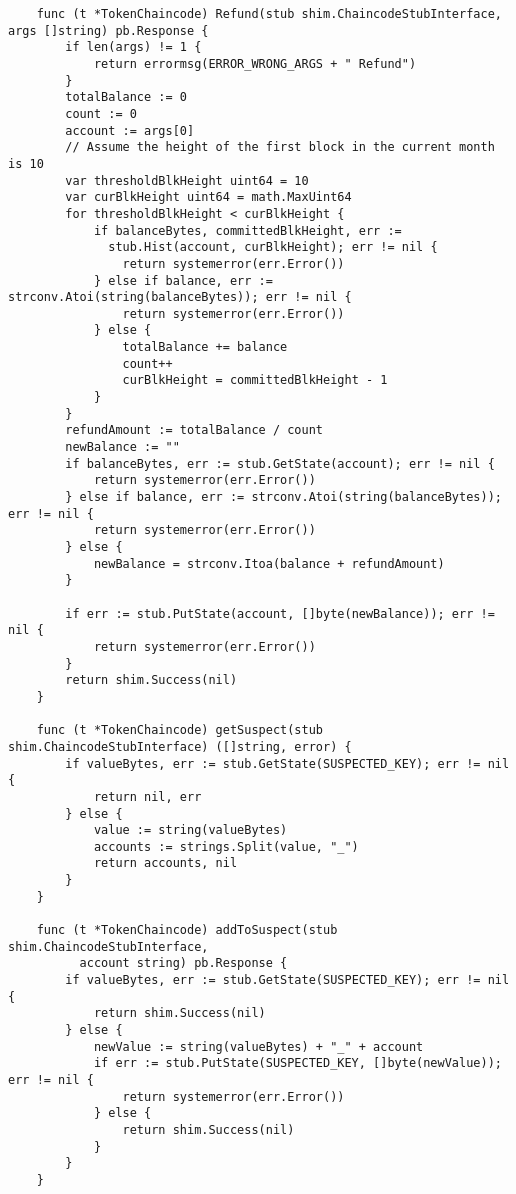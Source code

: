 \begin{lstlisting}
    func (t *TokenChaincode) Refund(stub shim.ChaincodeStubInterface, args []string) pb.Response {
        if len(args) != 1 { 
            return errormsg(ERROR_WRONG_ARGS + " Refund")
        }
        totalBalance := 0
        count := 0
        account := args[0]
        // Assume the height of the first block in the current month is 10
        var thresholdBlkHeight uint64 = 10
        var curBlkHeight uint64 = math.MaxUint64
        for thresholdBlkHeight < curBlkHeight {
            if balanceBytes, committedBlkHeight, err := 
              stub.Hist(account, curBlkHeight); err != nil {
                return systemerror(err.Error())
            } else if balance, err := strconv.Atoi(string(balanceBytes)); err != nil {
                return systemerror(err.Error())
            } else {
                totalBalance += balance
                count++
                curBlkHeight = committedBlkHeight - 1
            }
        }
        refundAmount := totalBalance / count
        newBalance := ""
        if balanceBytes, err := stub.GetState(account); err != nil {
            return systemerror(err.Error())
        } else if balance, err := strconv.Atoi(string(balanceBytes)); err != nil {
            return systemerror(err.Error())
        } else {
            newBalance = strconv.Itoa(balance + refundAmount)
        }
    
        if err := stub.PutState(account, []byte(newBalance)); err != nil {
            return systemerror(err.Error())
        }
        return shim.Success(nil)
    }
    
    func (t *TokenChaincode) getSuspect(stub shim.ChaincodeStubInterface) ([]string, error) {
        if valueBytes, err := stub.GetState(SUSPECTED_KEY); err != nil {
            return nil, err
        } else {
            value := string(valueBytes)
            accounts := strings.Split(value, "_")
            return accounts, nil
        }
    }
    
    func (t *TokenChaincode) addToSuspect(stub shim.ChaincodeStubInterface, 
          account string) pb.Response {
        if valueBytes, err := stub.GetState(SUSPECTED_KEY); err != nil {
            return shim.Success(nil)
        } else {
            newValue := string(valueBytes) + "_" + account
            if err := stub.PutState(SUSPECTED_KEY, []byte(newValue)); err != nil {
                return systemerror(err.Error())
            } else {
                return shim.Success(nil)
            }
        }
    }
    

\end{lstlisting}
